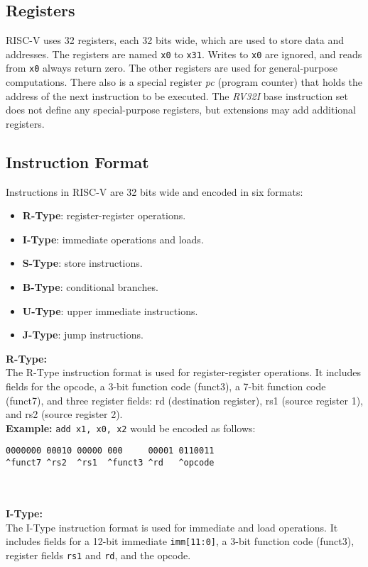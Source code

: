 \documentclass[sigconf]{acmart}
\begin{document}
\subsection{Registers}
RISC-V uses 32 registers, each 32 bits wide, which are used to store data and addresses. The registers are named \texttt{x0} to \texttt{x31}. Writes to \texttt{x0} are ignored, and reads from \texttt{x0} always return zero. The other registers are used for general-purpose computations.
There also is a special register \textit{pc} (program counter) that holds the address of the next instruction to be executed. The \textit{RV32I} base instruction set does not define any special-purpose registers, but extensions may add additional registers. \cite{riscv-spec}

\subsection{Instruction Format}
Instructions in RISC-V are 32 bits wide and encoded in six formats:
\begin{itemize}
  \item \textbf{R-Type}: register-register operations.
  \item \textbf{I-Type}: immediate operations and loads.
  \item \textbf{S-Type}: store instructions.
  \item \textbf{B-Type}: conditional branches.
  \item \textbf{U-Type}: upper immediate instructions.
  \item \textbf{J-Type}: jump instructions.
\end{itemize}
%
\textbf{R-Type:} \\
The R-Type instruction format is used for register-register operations. It includes fields for the opcode, a 3-bit function code (funct3), a 7-bit function code (funct7), and three register fields: rd (destination register), rs1 (source register 1), and rs2 (source register 2). \\
\textbf{Example:} \texttt{add x1, x0, x2} would be encoded as follows:
\begin{verbatim}
0000000 00010 00000 000     00001 0110011
^funct7 ^rs2  ^rs1  ^funct3 ^rd   ^opcode
\end{verbatim} \\~\\
%
\textbf{I-Type:} \\
The I-Type instruction format is used for immediate and load operations. It includes fields for a 12-bit immediate \texttt{imm[11:0]}, a 3-bit function code (funct3), register fields \texttt{rs1} and \texttt{rd}, and the opcode. \\
\end{document}

